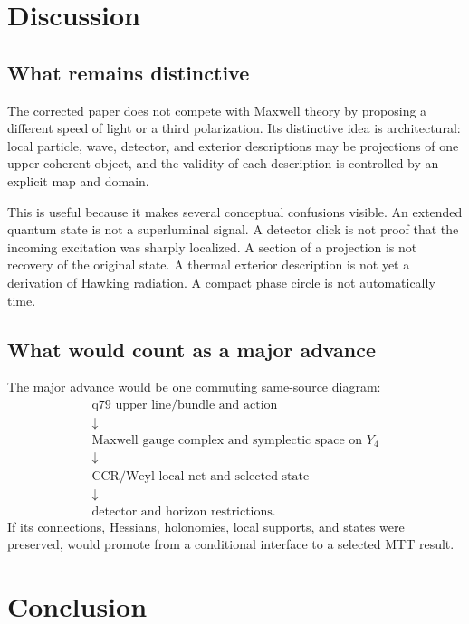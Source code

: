 \documentclass[11pt,a4paper]{article}
\numberwithin{equation}{section}
\theoremstyle{definition}
\theoremstyle{remark}
\begin{document}
\section{Discussion}

\subsection{What remains distinctive}

The corrected paper does not compete with Maxwell theory by proposing a
different speed of light or a third polarization.  Its distinctive idea
is architectural: local particle, wave, detector, and exterior
descriptions may be projections of one upper coherent object, and the
validity of each description is controlled by an explicit map and
domain.

This is useful because it makes several conceptual confusions visible.
An extended quantum state is not a superluminal signal.  A detector click
is not proof that the incoming excitation was sharply localized.  A
section of a projection is not recovery of the original state.  A
thermal exterior description is not yet a derivation of Hawking
radiation.  A compact phase circle is not automatically time.

\subsection{What would count as a major advance}

The major advance would be one commuting same-source diagram:
\[
\begin{gathered}
\text{q79 upper line/bundle and action}\\
\downarrow\\
\text{Maxwell gauge complex and symplectic space on }Y_4\\
\downarrow\\
\text{CCR/Weyl local net and selected state}\\
\downarrow\\
\text{detector and horizon restrictions}.
\end{gathered}
\]
If its connections, Hessians, holonomies, local supports, and states were
preserved,  would promote from a conditional
interface to a selected MTT result.

\section{Conclusion}
\end{document}
